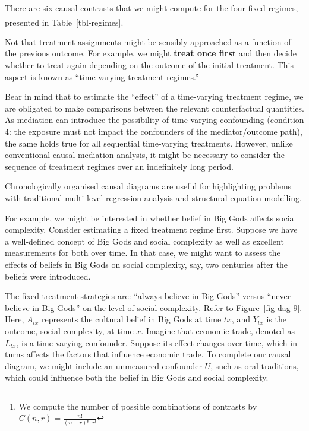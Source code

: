 \documentclass[
  singlecolumn]{article}
\begin{document}
There are six causal contrasts that we might compute for the four fixed
regimes, presented in Table~\ref{tbl-regimes}.\footnote{We compute the
  number of possible combinations of contrasts by
  \(C(n, r) = \frac{n!}{(n-r)! \cdot r!}\)}

Not that treatment assignments might be sensibly approached as a
function of the previous outcome. For example, we might \textbf{treat
once first} and then decide whether to treat again depending on the
outcome of the initial treatment. This aspect is known as ``time-varying
treatment regimes.''

Bear in mind that to estimate the ``effect'' of a time-varying treatment
regime, we are obligated to make comparisons between the relevant
counterfactual quantities. As mediation can introduce the possibility of
time-varying confounding (condition 4: the exposure must not impact the
confounders of the mediator/outcome path), the same holds true for all
sequential time-varying treatments. However, unlike conventional causal
mediation analysis, it might be necessary to consider the sequence of
treatment regimes over an indefinitely long period.

Chronologically organised causal diagrams are useful for highlighting
problems with traditional multi-level regression analysis and structural
equation modelling.

For example, we might be interested in whether belief in Big Gods
affects social complexity. Consider estimating a fixed treatment regime
first. Suppose we have a well-defined concept of Big Gods and social
complexity as well as excellent measurements for both over time. In that
case, we might want to assess the effects of beliefs in Big Gods on
social complexity, say, two centuries after the beliefs were introduced.

The fixed treatment strategies are: ``always believe in Big Gods''
versus ``never believe in Big Gods'' on the level of social complexity.
Refer to Figure~\ref{fig-dag-9}. Here, \(A_{tx}\) represents the
cultural belief in Big Gods at time \(tx\), and \(Y_{tx}\) is the
outcome, social complexity, at time \(x\). Imagine that economic trade,
denoted as \(L_{tx}\), is a time-varying confounder. Suppose its effect
changes over time, which in turns affects the factors that influence
economic trade. To complete our causal diagram, we might include an
unmeasured confounder \(U\), such as oral traditions, which could
influence both the belief in Big Gods and social complexity.
\end{document}
